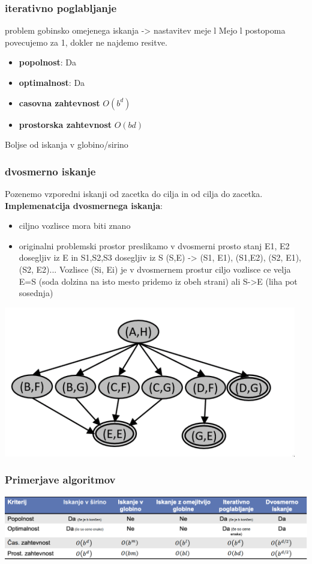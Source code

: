 \subsubsection{iterativno poglabljanje}
problem gobinsko omejenega iskanja -> nastavitev meje l
Mejo l postopoma povecujemo za 1, dokler ne najdemo resitve.
\begin{itemize}[noitemsep,topsep=0pt]
    \item \textbf{popolnost}: Da
    \item \textbf{optimalnost}: Da
    \item \textbf{casovna zahtevnost} $O(b^d)$
    \item \textbf{prostorska zahtevnost} $O(bd)$
\end{itemize}
Boljse od iskanja v globino/sirino
\subsubsection{dvosmerno iskanje}
Pozenemo vzporedni iskanji od zacetka do cilja in od cilja do zacetka.\\
\textbf{Implemenatcija dvosmernega iskanja}:
\begin{itemize}[noitemsep,topsep=0pt,leftmargin=*]
    \item ciljno vozlisce mora biti znano
    \item originalni problemski prostor preslikamo v dvosmerni prosto stanj
    E1, E2 dosegljiv iz E in S1,S2,S3 dosegljiv iz S
    (S,E) -> {(S1, E1), (S1,E2), (S2, E1), (S2, E2)...}
    Vozlisce (Si, Ei) je v dvosmernem prostur ciljo vozlisce ce velja E=S (soda dolzina na isto mesto pridemo iz obeh strani) ali S->E (liha pot sosednja)
\end{itemize}
\includegraphics[width=\columnwidth]{images/dvosmerno-iskanje.png}

\subsubsection{Primerjave algoritmov}
\includegraphics[width=\columnwidth]{images/neinformirano_iskanje.png}

